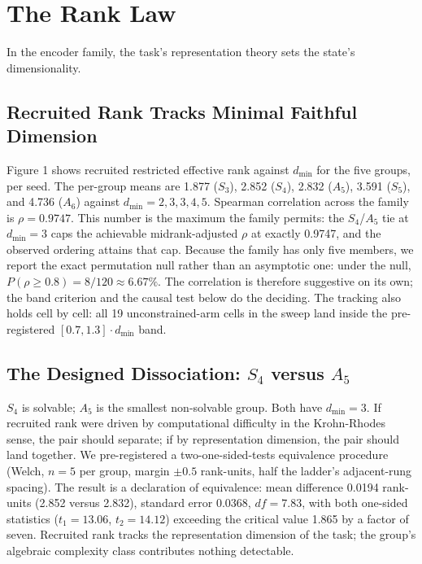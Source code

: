 \section{The Rank Law}

In the encoder family, the task's representation theory sets the
state's dimensionality.

\subsection{Recruited Rank Tracks Minimal Faithful Dimension}

Figure 1 shows recruited restricted effective rank against $d_{\min}$
for the five groups, per seed. The per-group means are 1.877 ($S_3$),
2.852 ($S_4$), 2.832 ($A_5$), 3.591 ($S_5$), and 4.736 ($A_6$) against
$d_{\min} = 2, 3, 3, 4, 5$. Spearman correlation
across the family is $\rho = 0.9747$. This number
is the maximum the family permits: the $S_4$/$A_5$ tie at $d_{\min}=3$
caps the achievable midrank-adjusted $\rho$ at exactly 0.9747, and the
observed ordering attains that cap. Because the
family has only five members, we report the exact permutation null
rather than an asymptotic one: under the null, $P(\rho \ge 0.8) = 8/120 \approx 6.67\%$. The correlation is therefore suggestive on its
own; the band criterion and the causal test below do the deciding. The
tracking also holds cell by cell: all 19 unconstrained-arm cells in the
sweep land inside the pre-registered $[0.7, 1.3] \cdot d_{\min}$ band.

\subsection{The Designed Dissociation: $S_4$ versus $A_5$}

$S_4$ is solvable; $A_5$ is the smallest non-solvable group. Both have
$d_{\min}=3$. If recruited rank were driven by computational difficulty
in the Krohn-Rhodes sense, the pair should separate; if by
representation dimension, the pair should land together. We
pre-registered a two-one-sided-tests equivalence procedure (Welch, $n=5$
per group, margin $\pm 0.5$ rank-units, half the ladder's adjacent-rung
spacing). The result is a declaration of equivalence: mean difference
0.0194 rank-units (2.852 versus 2.832), standard error 0.0368, $df =
7.83$, with both one-sided statistics ($t_1 = 13.06$, $t_2 = 14.12$)
exceeding the critical value 1.865 by a factor of seven. Recruited rank tracks the representation
dimension of the task; the group's algebraic complexity class
contributes nothing detectable.

